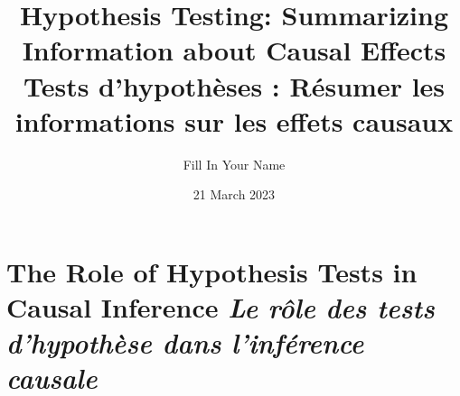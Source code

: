 \documentclass[
  ignorenonframetext,
]{beamer}
\title{Hypothesis Testing: Summarizing Information about Causal Effects
\textbar{} Tests d'hypothèses : Résumer les informations sur les effets
causaux}
\author{Fill In Your Name}
\date{21 March 2023}
\begin{document}
\frame{\titlepage}

\begin{frame}[allowframebreaks]
  \tableofcontents[hideallsubsections]
\end{frame}
\hypertarget{the-role-of-hypothesis-tests-in-causal-inference-le-ruxf4le-des-tests-dhypothuxe8se-dans-linfuxe9rence-causale}{%
\section{\texorpdfstring{The Role of Hypothesis Tests in Causal
Inference \textbar{} \emph{Le rôle des tests d'hypothèse dans
l'inférence
causale}}{The Role of Hypothesis Tests in Causal Inference \textbar{} Le rôle des tests d'hypothèse dans l'inférence causale}}\label{the-role-of-hypothesis-tests-in-causal-inference-le-ruxf4le-des-tests-dhypothuxe8se-dans-linfuxe9rence-causale}}
\end{document}
